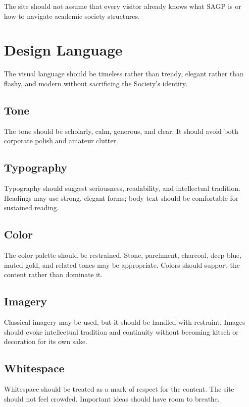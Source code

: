 \documentclass[11pt]{article}
\begin{document}
The site should not assume that every visitor already knows what SAGP is or how to navigate academic society structures.

\section{Design Language}

The visual language should be timeless rather than trendy, elegant rather than flashy, and modern without sacrificing the Society's identity.

\subsection{Tone}

The tone should be scholarly, calm, generous, and clear. It should avoid both corporate polish and amateur clutter.

\subsection{Typography}

Typography should suggest seriousness, readability, and intellectual tradition. Headings may use strong, elegant forms; body text should be comfortable for sustained reading.

\subsection{Color}

The color palette should be restrained. Stone, parchment, charcoal, deep blue, muted gold, and related tones may be appropriate. Colors should support the content rather than dominate it.

\subsection{Imagery}

Classical imagery may be used, but it should be handled with restraint. Images should evoke intellectual tradition and continuity without becoming kitsch or decoration for its own sake.

\subsection{Whitespace}

Whitespace should be treated as a mark of respect for the content. The site should not feel crowded. Important ideas should have room to breathe.
\end{document}
